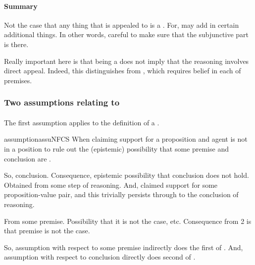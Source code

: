 \paragraph{Summary}

\begin{note}
  Not the case that any thing that is appealed to is a \requ{}.
  For, may add in certain additional things.
  In other words, careful to make sure that the subjunctive part is there.
\end{note}

\begin{note}
  Really important here is that being a \requ{} does not imply that the reasoning involves direct appeal.
  {
    \color{red}
    Indeed, this distinguishes from \citeauthor{Sgaravatti:2013wu}, which requires belief in each of premises.
  }
\end{note}

\subsubsection{Two assumptions relating to }
\label{sec:two-assumpt-relat-to-requ}

\paragraph{\ideaCSA{}}

\begin{note}
  The first assumption applies \ideaCSA{} to the definition of a \requ{}.

  \begin{restatable}{assumption}{assuNFCS}
    \label{assu:supp:nfactive}
    When claiming support for a proposition and agent is not in a position to rule out the (epistemic) possibility that some premise and conclusion are .
  \end{restatable}

  So, conclusion.
  Consequence, epistemic possibility that conclusion does not hold.
  Obtained from some step of reasoning.
  And, claimed support for some proposition-value pair, and this trivially persists through to the conclusion of reasoning.

  From some premise.
  Possibility that it is not the case, etc.
  Consequence from 2 is that premise is not the case.

  So, assumption with respect to some premise indirectly does the first of \ideaCSA{}.
  And, assumption with respect to conclusion directly does second of \ideaCSA{}.
\end{note}

